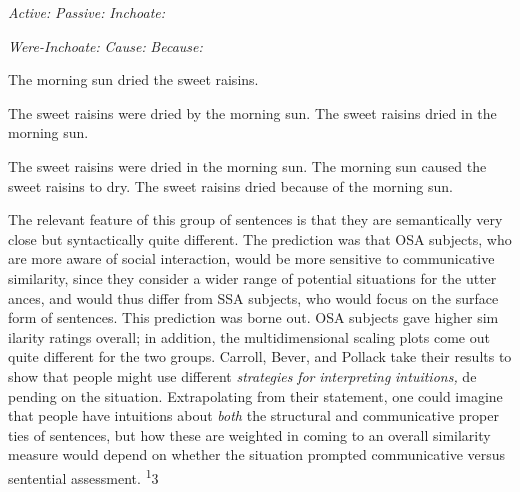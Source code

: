 \begin{multicols}{2}
\begin{styleStandard}
\textit{Active:}\textit{ }\textit{Passive:}\textit{ }\textit{Inchoate:}
\end{styleStandard}


\begin{styleStandard}
\textit{Were-Inchoate:}\textit{ }\textit{Cause:}\textit{ }\textit{Because:}
\end{styleStandard}


\begin{styleStandard}
The morning sun dried the sweet raisins.
\end{styleStandard}


\begin{styleStandard}
The sweet raisins were dried by the morning sun. The sweet raisins dried in the morning sun.
\end{styleStandard}


\begin{styleStandard}
The sweet raisins were dried in the morning sun. The morning sun caused the sweet raisins to dry. The sweet raisins dried because of the morning sun.
\end{styleStandard}


\end{multicols}
\begin{styleStandard}
The relevant feature of this group of sentences is that they are semantically very close but syntactically quite different. The prediction was that OSA subjects, who are more aware of social interaction, would be more sensitive to communicative similarity, since they consider a wider range of potential situations for the utter\- ances, and would thus differ from SSA subjects, who would focus on the surface form of sentences. This prediction was borne out. OSA subjects gave higher sim\- ilarity ratings overall; in addition, the multidimensional scaling plots come out quite different for the two groups. Carroll, Bever, and Pollack take their results to show that people might use different \textit{strategies}\textit{ }\textit{for}\textit{ }\textit{interpreting}\textit{ }\textit{intuitions,}\textit{ }de\- pending on the situation. Extrapolating from their statement, one could imagine that people have intuitions about \textit{both}\textit{ }the structural and communicative proper\- ties of sentences, but how these are weighted in coming to an overall similarity measure would depend on whether the situation prompted communicative versus sentential assessment. \textsuperscript{1}3
\end{styleStandard}


